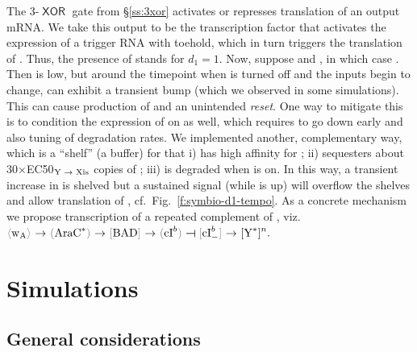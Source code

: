 \documentclass[12pt,notitlepage]{article}
\newcommand{\XOR}{\ensuremath{\mathop{\mathsf{XOR}}}\xspace}
\newcommand{\cbra}[1]{{\ensuremath{\color{gray}{#1}}}}
\newcommand{\signal}[1]{{{\cbra{\langle}\ce{#1}\cbra{\rangle}}}}
\newcommand{\protein}[1]{{{\cbra{(}\ce{#1}\cbra{)}}}}
\newcommand{\promoter}[1]{{{\cbra{[}\ce{#1}\cbra{]}}}}
\newcommand{\act}{\ {\ensuremath{\mathbin{\to}}}\ }
\newcommand{\rep}{\ {\ensuremath{\mathrel{\raisebox{-.3ex}{\rotatebox{90}{\scalebox{1}[1.2]{$\bot$}}}}}}\ }
\newcommand{\ra}[1]{{\color{Blue}#1}}
\begin{document}
\ra{
The 3-\XOR gate from \S\ref{ss:3xor}
activates or represses translation of an output mRNA.
%
We take this output to be 
the transcription factor \ce{cI^a}
that activates the expression of 
a trigger RNA \ce{Y} with toehold,
which 
in turn triggers the translation of \ce{Xis}.
%
Thus, the presence of \ce{Y} stands for $d_1 = 1$.
}
%
%
%
Now, suppose
 and ,
in which case .
%
%
Then  is low,
but
around the timepoint when 
 is turned off
and the inputs begin to change,
 can exhibit a transient bump
(which we observed in some simulations).
%
This can cause production of 
and 
an unintended \emph{reset}.
%
One way to mitigate this is to condition 
the expression of 
on  as well,
which requires  to go down early
and also tuning of degradation rates.
%
We implemented another, complementary way,
which
is a ``shelf'' (a buffer) for 
that 
%
i)
has high affinity for ;
%
ii)
sequesters 
about 
30$\times$EC50${}_\text{\ce{Y}\act\ce{Xis}}$
copies of ;
%
iii)
is degraded when  is on.
%
In this way, 
a transient increase in  is shelved
but a sustained signal 
(while  is up)
will overflow the shelves and 
allow
translation of ,
cf.~Fig.~\ref{f:symbio-d1-tempo}.
%
%
%
%
As a concrete mechanism
we propose
transcription of 
a repeated complement of ,
viz.~%
$
	\signal{\ce{w_A}} \act \protein{AraC^*} \act \promoter{BAD} 
	\act 
	\protein{cI^b} \rep \promoter{cI^b_-} \act
	\ce{[Y^*]^n}
	.
$
%



\section{Simulations}

\subsection{General considerations}
\end{document}
